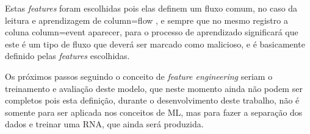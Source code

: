         Estas \textit{features} foram escolhidas pois elas definem um fluxo comum, no caso da leitura e aprendizagem de column=flow , e sempre que no mesmo registro a coluna column=event aparecer, para o processo de aprendizado significará que este é um tipo de fluxo que deverá ser marcado como malicioso, e é basicamente definido pelas \textit{features} escolhidas.

        Os próximos passos seguindo o conceito de \textit{feature engineering} seriam o treinamento e avaliação deste modelo, que neste momento ainda não podem ser completos pois esta definição, durante o desenvolvimento deste trabalho, não é somente para ser aplicada nos conceitos de ML, mas para fazer a separação dos dados e treinar uma RNA, que ainda será produzida.
